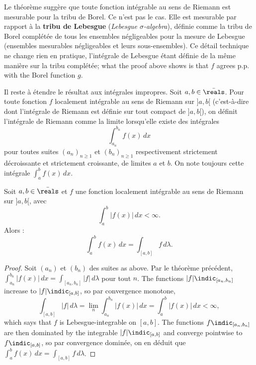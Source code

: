 \begin{remark}
  Le théorème suggère que toute fonction intégrable au sens de Riemann est mesurable
  pour la tribu de Borel. Ce n'est pas le cas. Elle est mesurable par rapport à la
  \textbf{tribu de Lebesgue} (\textit{Lebesgue $\sigma$-algebra}), définie comme la
  tribu de Borel complétée de tous les ensembles négligeables pour la mesure de
  Lebesgue (ensembles mesurables négligeables et leurs sous-ensembles). Ce détail
  technique ne change rien en pratique, l'intégrale de Lebesgue étant définie de la
  même manière sur la tribu complétée; what the proof above shows is that $f$ agrees
  p.p. with the Borel function $g$.
\end{remark}

Il reste à étendre le résultat aux intégrales impropres. Soit $a, b \in \bar{\reals}$.
Pour toute fonction $f$ localement intégrable au sens de Riemann sur $]a,b[$
(c'est-à-dire dont l'intégrale de Riemann est définie sur tout compact de $]a,b[$),
on définit l'intégrale de Riemann comme la limite lorsqu'elle existe des intégrales
\[
  \int_{a_{n}}^{b_{n}} f(x) \, dx
\]
pour toutes suites $(a_{n})_{n \geq 1}$ et $(b_{n})_{n \geq 1}$ respectivement
strictement décroissante et strictement croissante, de limites $a$ et $b$. On note
toujours cette intégrale $\int_{a}^{b} f(x) \, dx$.

\begin{theorem}
  Soit $a, b \in \bar{\reals}$ et $f$ une fonction localement intégrable au sens de
  Riemann sur $]a,b[$, avec
  \[
    \int_{a}^{b} |f(x)| \, dx < \infty .
  \]
  Alors :
  \[
    \int_{a}^{b} f(x) \, dx = \int_{[a,b]} f \, d\lambda .
  \]
\end{theorem}

\begin{proof}
  Soit $(a_{n})$ et $(b_{n})$ des suites as above. Par le théorème précédent,
  $\int_{a_{n}}^{b_{n}} |f(x)| \, dx = \int_{[a_{n},b_{n}]} |f| \, d\lambda$ pour
  tout $n$. The functions $|f| \indic_{[a_{n},b_{n}]}$ increase to $|f|
  \indic_{[a,b]}$, so par convergence monotone,
  \[
    \int_{[a,b]} |f| \, d\lambda = \lim_{n} \int_{a_{n}}^{b_{n}} |f(x)| \, dx
    = \int_{a}^{b} |f(x)| \, dx < \infty ,
  \]
  which says that $f$ is Lebesgue-integrable on $[a,b]$. The functions $f
  \indic_{[a_{n},b_{n}]}$ are then dominated by the integrable $|f| \indic_{[a,b]}$
  and converge pointwise to $f \indic_{[a,b]}$, so par convergence dominée, on en
  déduit que $\int_{a}^{b} f(x) \, dx = \int_{[a,b]} f \, d\lambda$.
\end{proof}

